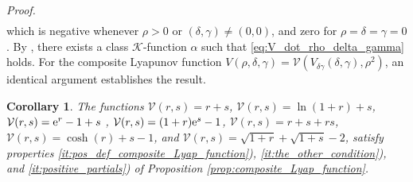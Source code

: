 \documentclass[journal,twoside,web]{ieeecolor}
\newtheorem{corollary}{Corollary}
\theoremstyle{definition}
\renewenvironment{proof}[1][Proof]{\par\pushQED{\qed}\normalfont\textit{#1.}~}{\popQED\par}
\begin{document}
\begin{proof}
\begin{align}
\end{align}
which is negative whenever $\rho > 0$ or $(\delta, \gamma) \ne (0,0)$, and zero for $\rho = \delta = \gamma = 0$. By \cite[Lemma 4.3]{khalil_nonlinear_2002}, there exists a class $\mathcal{K}$-function $\alpha$ such that \eqref{eq:V_dot_rho_delta_gamma} holds. 
%
For the composite Lyapunov function $V(\rho,\delta,\gamma) = \mathcal{V}( V_{\delta \gamma}(\delta,\gamma), \rho^2)$, 
an identical argument establishes the result. 
\end{proof}

\begin{corollary} 
\label{cor:example_composite_CLFs}
    The  functions
 $\mathcal{V}(r,s)= r+s$, $\mathcal{V}(r,s)= \ln(1+r) + s$, $\mathcal{V}(r,s)= {\rm e}^{r} - 1 + s$ , $\mathcal{V}(r,s)= (1+r){\rm e}^{s} -1$, $\mathcal{V}(r,s) = r+s+rs$, $\mathcal{V}(r,s) = \cosh(r) + s - 1 $, and $\mathcal{V}(r,s)= \sqrt{1+r}+\sqrt{1+s} - 2$, satisfy properties \ref{it:pos_def_composite_Lyap_function}), \ref{it:the_other_condition}), and \ref{it:positive_partials}) of Proposition \ref{prop:composite_Lyap_function}.
\end{corollary}

\end{document}
